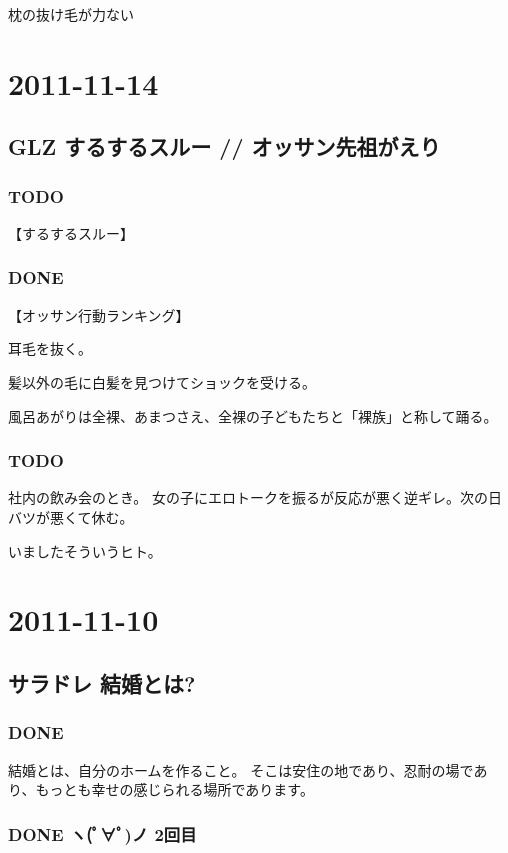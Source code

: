 \documentclass[11pt]{article}
\begin{document}
枕の抜け毛が力ない
\section{2011-11-14}
\label{sec-39}
\subsection{GLZ するするスルー // オッサン先祖がえり}
\label{sec-39_1}
\subsubsection{\textbf{TODO}}
\label{sec-39_1_1}

【するするスルー】
\subsubsection{\textbf{DONE}}
\label{sec-39_1_2}

【オッサン行動ランキング】

耳毛を抜く。

髪以外の毛に白髪を見つけてショックを受ける。

風呂あがりは全裸、あまつさえ、全裸の子どもたちと「裸族」と称して踊る。
\subsubsection{\textbf{TODO}}
\label{sec-39_1_3}

社内の飲み会のとき。
女の子にエロトークを振るが反応が悪く逆ギレ。次の日バツが悪くて休む。

いましたそういうヒト。
\section{2011-11-10}
\label{sec-40}
\subsection{サラドレ 結婚とは?}
\label{sec-40_1}
\subsubsection{\textbf{DONE}}
\label{sec-40_1_1}

結婚とは、自分のホームを作ること。
そこは安住の地であり、忍耐の場であり、もっとも幸せの感じられる場所であります。
\subsubsection{\textbf{DONE} ヽ(ﾟ∀ﾟ)ノ 2回目}
\label{sec-40_1_2}
\end{document}
